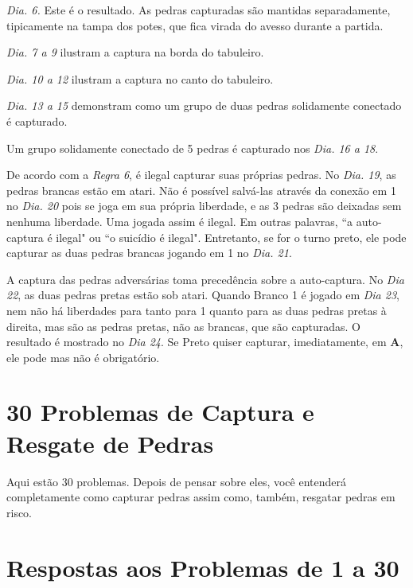 \emph{Dia. 6.} Este é o resultado. As pedras capturadas são mantidas separadamente, tipicamente na tampa dos potes, que fica virada do avesso durante a partida.

\emph{Dia. 7 a 9} ilustram a captura na borda do tabuleiro.

\emph{Dia. 10 a 12} ilustram a captura  no canto do tabuleiro.

\emph{Dia. 13 a 15} demonstram  como um grupo de duas pedras solidamente conectado é capturado.

Um grupo solidamente conectado de 5 pedras é capturado nos \emph{Dia. 16 a 18}.

De acordo com a \emph{Regra 6}, é ilegal capturar suas próprias pedras. No \emph{Dia. 19}, as pedras brancas estão em atari. Não é possível salvá-las através da conexão em 1 no \emph{Dia. 20} pois se joga em sua própria liberdade, e as 3 pedras são deixadas sem nenhuma liberdade. Uma jogada assim é ilegal. Em outras palavras, ``a auto-captura é ilegal" ou ``o suicídio é ilegal". Entretanto, se for o turno preto, ele pode capturar as duas pedras brancas jogando em 1 no \emph{Dia. 21}.

A captura das pedras adversárias toma precedência sobre a auto-captura. No \emph{Dia 22}, as duas pedras pretas estão sob atari. Quando Branco 1 é jogado em \emph{Dia 23}, nem não há liberdades para tanto para 1 quanto para as duas pedras pretas à direita, mas são as pedras pretas, não as brancas, que são capturadas. O resultado é mostrado no \emph{Dia 24}. Se Preto quiser capturar, imediatamente, em \textbf{A}, ele pode mas não é obrigatório.

\section{30 Problemas de Captura e Resgate de Pedras}

Aqui estão 30 problemas. Depois de pensar sobre eles, você entenderá completamente como capturar pedras assim como, também, resgatar pedras em risco.

\section{Respostas aos Problemas de 1 a 30}

